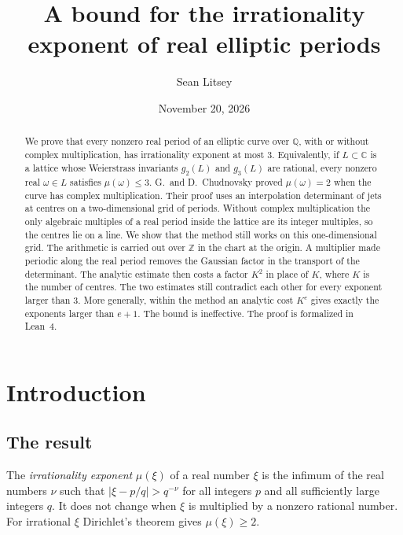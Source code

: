 \documentclass[11pt]{amsart}
\theoremstyle{definition}
\theoremstyle{remark}
\numberwithin{equation}{section}
\newcommand{\Z}{\mathbb Z}
\newcommand{\Q}{\mathbb Q}
\newcommand{\C}{\mathbb C}
\begin{document}
\title{A bound for the irrationality exponent of real elliptic periods}

\author{Sean Litsey}

\date{November 20, 2026}



\begin{abstract}
We prove that every nonzero real period of an elliptic curve over $\Q$, with or without complex
multiplication, has irrationality exponent at most $3$. Equivalently, if $L\subset\C$ is a lattice whose
Weierstrass invariants $g_2(L)$ and $g_3(L)$ are rational, every nonzero real $\omega\in L$ satisfies
$\mu(\omega)\le3$. G.~and
D.~Chudnovsky proved $\mu(\omega)=2$ when the curve has complex multiplication. Their proof uses an
interpolation determinant of jets at centres on a two-dimensional grid of periods. Without complex
multiplication the only algebraic multiples of a real period inside the lattice are its integer multiples, so
the centres lie on a line. We show that the method still works on this one-dimensional grid. The arithmetic is
carried out over $\Z$ in the chart at the origin. A multiplier made periodic along the real period removes the
Gaussian factor in the transport of the determinant. The analytic estimate then costs a factor $K^2$ in place
of $K$, where $K$ is the number of centres. The two estimates still contradict each other for every exponent
larger than $3$. More generally, within the method an analytic cost $K^e$ gives exactly the exponents larger
than $e+1$. The bound is ineffective. The proof is formalized in Lean~4.
\end{abstract}

\maketitle
\tableofcontents

\section{Introduction}\label{sec:intro}

\subsection{The result}
The \emph{irrationality exponent} $\mu(\xi)$ of a real number $\xi$ is the infimum of the real numbers $\nu$ such
that $|\xi-p/q|>q^{-\nu}$ for all integers $p$ and all sufficiently large integers $q$. It does not change when
$\xi$ is multiplied by a nonzero rational number. For irrational $\xi$ Dirichlet's theorem gives
$\mu(\xi)\ge2$.
\end{document}
